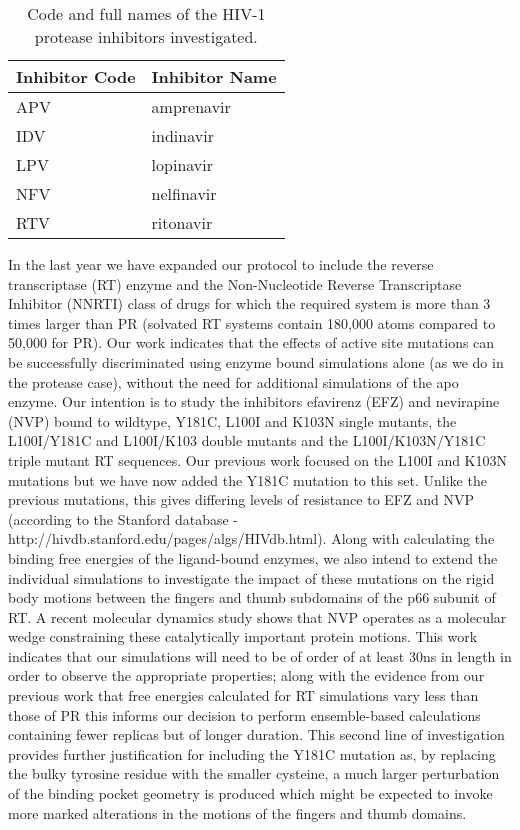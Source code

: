\begin{table}
\begin{center}
\begin{tabular}{l l}
\textbf{Inhibitor Code} & \textbf{Inhibitor Name}\\
\hline
APV & amprenavir\\
IDV & indinavir\\
LPV & lopinavir\\
NFV & nelfinavir\\
RTV & ritonavir\\
\hline
\end{tabular}
\end{center}
\caption{\small Code and full names of the HIV-1 protease inhibitors investigated.}
\label{tab:inhibitors}
\end{table}

In the last year we have expanded our protocol to include the reverse transcriptase (RT) enzyme and the Non-Nucleotide Reverse Transcriptase Inhibitor (NNRTI) class of drugs for which the required system is more than 3 times larger than PR (solvated RT systems contain 180,000 atoms compared to 50,000 for PR). Our work indicates that the effects of active site mutations can be successfully discriminated using enzyme bound simulations alone (as we do in the protease case), without the need for additional simulations of the apo enzyme. Our intention is to study the inhibitors efavirenz (EFZ) and nevirapine (NVP) bound to wildtype, Y181C, L100I and K103N single mutants, the L100I/Y181C and L100I/K103 double mutants and the L100I/K103N/Y181C triple mutant RT sequences. Our previous work focused on the L100I and K103N mutations but we have now added the Y181C mutation to this set. Unlike the previous mutations, this gives differing levels of resistance to EFZ and NVP (according to the Stanford database - http://hivdb.stanford.edu/pages/algs/HIVdb.html). Along with calculating the binding free energies of the ligand-bound enzymes, we also intend to extend the individual simulations to investigate the impact of these mutations on the rigid body motions between the fingers and thumb subdomains of the p66 subunit of RT. A recent molecular dynamics study shows that NVP operates as a molecular wedge constraining these catalytically important protein motions\cite{Ivetac2009}. This work indicates that our simulations will need to be of order of at least 30ns in length in order to observe the appropriate properties; along with the evidence from our previous work that free energies calculated for RT simulations vary less than those of PR this informs our decision to perform ensemble-based calculations containing fewer replicas but of longer duration. This second line of investigation provides further justification for including the Y181C mutation as, by replacing the bulky tyrosine residue with the smaller cysteine, a much larger perturbation of the binding pocket geometry is produced which might be expected to invoke more marked alterations in the motions of the fingers and thumb domains.


